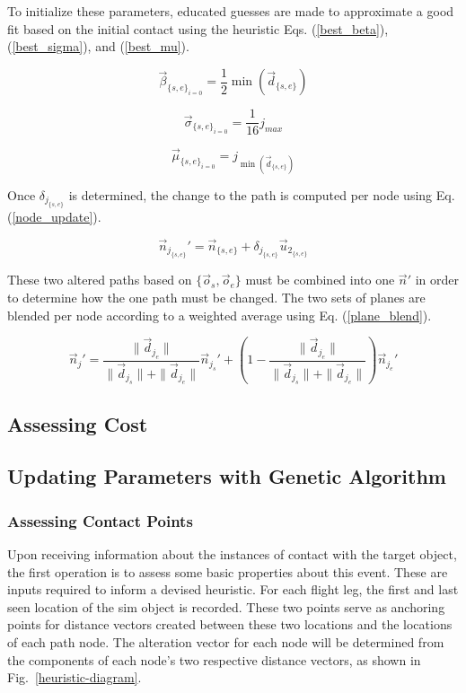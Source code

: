 \documentclass[conf]{new-aiaa}
\begin{document}
To initialize these parameters, educated guesses are made to approximate a good fit based on the initial contact using the heuristic Eqs. (\ref{best_beta}), (\ref{best_sigma}), and (\ref{best_mu}).

\begin{equation}
\label{best_beta}
\vec{\beta}_{\{s, e\}_{i = 0}} = \frac{1}{2}\min(\vec{d}_{\{s, e\}})
\end{equation}

\begin{equation}
\label{best_sigma}
\vec{\sigma}_{\{s, e\}_{i = 0}} = \frac{1}{16}j_{max}
\end{equation}

\begin{equation}
\label{best_mu}
\vec{\mu}_{\{s, e\}_{i = 0}} = j_{\min(\vec{d}_{\{s, e\}})}
\end{equation}

Once $\delta_{j_{\{s, e\}}}$ is determined, the change to the path is computed per node using Eq. (\ref{node_update}).

\begin{equation}
\label{node_update}
\vec{n}_{j_{{\{s, e\}}}}' = \vec{n}_{\{s, e\}} + \delta_{j_{\{s, e\}}}\vec{u}_{2_{\{s, e\}}}
\end{equation}

These two altered paths based on $\{\vec{o}_s, \vec{o}_e\}$ must be combined into one $\vec{n}'$ in order to determine how the one path must be changed. The two sets of planes are blended per node according to a weighted average using Eq. (\ref{plane_blend}).

\begin{equation}
\label{plane_blend}
\vec{n}_j' = \frac{\|\vec{d}_{j_e}\|}{\|\vec{d}_{j_s}\| + \|\vec{d}_{j_e}\|}\vec{n}_{j_s}' + \left(1 - \frac{\|\vec{d}_{j_e}\|}{\|\vec{d}_{j_s}\| + \|\vec{d}_{j_e}\|}\right)\vec{n}_{j_e}'
\end{equation}


\subsection{Assessing Cost}


\subsection{Updating Parameters with Genetic Algorithm}




\subsubsection{Assessing Contact Points}
Upon receiving information about the instances of contact with the target object, the first operation is to assess some basic properties about this event. These are inputs required to inform a devised heuristic. For each flight leg, the first and last seen location of the sim object is recorded. These two points serve as anchoring points for distance vectors created between these two locations and the locations of each path node. The alteration vector for each node will be determined from the components of each node's two respective distance vectors, as shown in Fig.~\ref{heuristic-diagram}.
\end{document}
